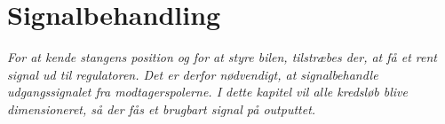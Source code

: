 \chapter{Signalbehandling}\label{kap:chap_signal}
\emph{For at kende stangens position og for at styre bilen, tilstræbes der, at få et rent signal ud til regulatoren. Det er derfor nødvendigt, at signalbehandle udgangssignalet fra modtagerspolerne. I dette kapitel vil alle kredsløb blive dimensioneret, så der fås et brugbart signal på outputtet. }